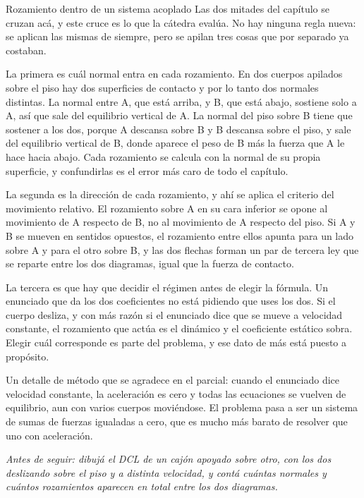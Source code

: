 \documentclass[11pt,openany]{book}
\begin{document}
\begin{bloque}{Rozamiento dentro de un sistema acoplado}
Las dos mitades del capítulo se cruzan acá, y este cruce es lo que la cátedra evalúa. No hay ninguna regla nueva: se aplican las mismas de siempre, pero se apilan tres cosas que por separado ya costaban.

La primera es cuál normal entra en cada rozamiento. En dos cuerpos apilados sobre el piso hay dos superficies de contacto y por lo tanto dos normales distintas. La normal entre A, que está arriba, y B, que está abajo, sostiene solo a A, así que sale del equilibrio vertical de A. La normal del piso sobre B tiene que sostener a los dos, porque A descansa sobre B y B descansa sobre el piso, y sale del equilibrio vertical de B, donde aparece el peso de B más la fuerza que A le hace hacia abajo. Cada rozamiento se calcula con la normal de su propia superficie, y confundirlas es el error más caro de todo el capítulo.

La segunda es la dirección de cada rozamiento, y ahí se aplica el criterio del movimiento relativo. El rozamiento sobre A en su cara inferior se opone al movimiento de A respecto de B, no al movimiento de A respecto del piso. Si A y B se mueven en sentidos opuestos, el rozamiento entre ellos apunta para un lado sobre A y para el otro sobre B, y las dos flechas forman un par de tercera ley que se reparte entre los dos diagramas, igual que la fuerza de contacto.

La tercera es que hay que decidir el régimen antes de elegir la fórmula. Un enunciado que da los dos coeficientes no está pidiendo que uses los dos. Si el cuerpo desliza, y con más razón si el enunciado dice que se mueve a velocidad constante, el rozamiento que actúa es el dinámico y el coeficiente estático sobra. Elegir cuál corresponde es parte del problema, y ese dato de más está puesto a propósito.

Un detalle de método que se agradece en el parcial: cuando el enunciado dice velocidad constante, la aceleración es cero y todas las ecuaciones se vuelven de equilibrio, aun con varios cuerpos moviéndose. El problema pasa a ser un sistema de sumas de fuerzas igualadas a cero, que es mucho más barato de resolver que uno con aceleración.

\textit{Antes de seguir: dibujá el DCL de un cajón apoyado sobre otro, con los dos deslizando sobre el piso y a distinta velocidad, y contá cuántas normales y cuántos rozamientos aparecen en total entre los dos diagramas.}
\end{bloque}
\end{document}
